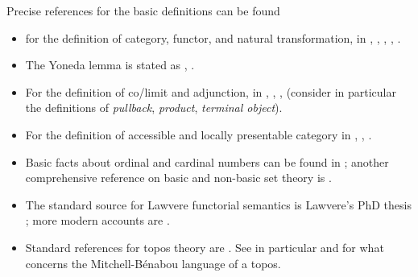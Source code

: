 Precise references for the basic definitions can be found
\begin{itemize}
	\item for the definition of category, functor, and natural transformation, in \cite[1.2.1]{Bor1}, \cite[I.2]{McL}, \cite[1.2.2]{Bor1}, \cite[I.3]{McL}, \cite[1.3.1]{Bor1}.
	\item The Yoneda lemma is stated as \cite[1.3.3]{Bor1}, \cite[III.2]{McL}.
	\item For the definition of co/limit and adjunction, in \cite[2.6.2]{Bor1}, \cite[III.3]{McL}, \cite[2.6.6]{Bor1}, \cite[III.4]{McL} (consider in particular the definitions of \emph{pullback}, \emph{product}, \emph{terminal object}).
	\item For the definition of accessible and locally presentable category in \cite[5.3.1]{Bor2}, \cite[5.2.1]{Bor2}, \cite{Adamek1994}.%
	\item Basic facts about ordinal and cardinal numbers can be found in \cite{kunen}; another comprehensive reference on basic and non-basic set theory is \cite{jech2013set}.
	\item The standard source for Lawvere functorial semantics is Lawvere's PhD thesis \cite{lawvere1963functorial}; more modern accounts are \cite{hyland2007category}.
	\item Standard references for topos theory are \cite{mac1992sheaves,JohnstonePT}. See in particular \cite[VI.5]{mac1992sheaves} and \cite[5.4]{JohnstonePT} for what concerns the Mitchell-Bénabou language of a topos.
\end{itemize}



